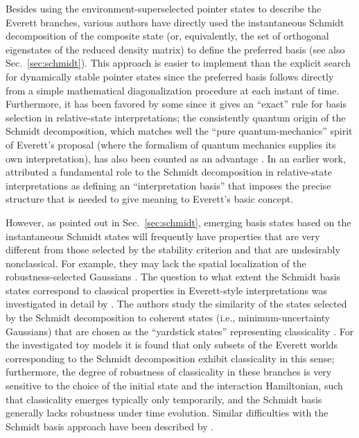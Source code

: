 \documentclass[twocolumn,rmp,aps,amsmath,amsfonts,noshowkeys,noshowpacs]{revtex4}
\begin{document}
Besides using the environment-superselected pointer states to describe
the Everett branches, various authors have directly used the
instantaneous Schmidt decomposition of the composite state (or,
equivalently, the set of orthogonal eigenstates of the reduced density
matrix) to define the preferred basis (see also
Sec.~\ref{sec:schmidt}). This approach is easier to implement than the
explicit search for dynamically stable pointer states since the
preferred basis follows directly from a simple mathematical
diagonalization procedure at each instant of time. Furthermore, it has
been favored by some \citep[e.g.,][]{Zeh:1973:wq} since it gives an
``exact'' rule for basis selection in relative-state interpretations;
the consistently quantum origin of the Schmidt decomposition, which
matches well the ``pure quantum-mechanics'' spirit of Everett's
proposal (where the formalism of quantum mechanics supplies its own
interpretation), has also been counted as an advantage
\citep{Barvinsky:1995:pa}. In an earlier work, \citet{Deutsch:1985:rx}
attributed a fundamental role to the Schmidt decomposition in
relative-state interpretations as defining an ``interpretation basis''
that imposes the precise structure that is needed to give meaning to
Everett's basic concept.

However, as pointed out in Sec.~\ref{sec:schmidt}, emerging basis
states based on the instantaneous Schmidt states will frequently have
properties that are very different from those selected by the
stability criterion and that are undesirably nonclassical. For
example, they may lack the spatial localization of the
robustness-selected Gaussians \citep{Stapp:2002:pc}. The question to
what extent the Schmidt basis states correspond to classical
properties in Everett-style interpretations was investigated in detail
by \citet{Barvinsky:1995:pa}. The authors study the similarity of the
states selected by the Schmidt decomposition to coherent states (i.e.,
minimum-uncertainty Gaussians) that are chosen as the ``yardstick
states'' representing classicality \citep[see also][]{Eisert:2003:ib}.
For the investigated toy models it is found that only subsets of the
Everett worlds corresponding to the Schmidt decomposition exhibit
classicality in this sense; furthermore, the degree of robustness of
classicality in these branches is very sensitive to the choice of the
initial state and the interaction Hamiltonian, such that classicality
emerges typically only temporarily, and the Schmidt basis generally
lacks robustness under time evolution.  Similar difficulties with the
Schmidt basis approach have been described by \citet{Kent:1997:oz}.
\end{document}
